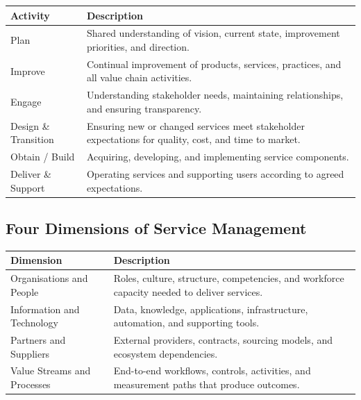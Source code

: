 \documentclass[
  letterpaper,
  DIV=11,
  numbers=noendperiod]{scrartcl}
\begin{document}
\begin{longtable}[]{@{}
  >{\raggedright\arraybackslash}p{}
  >{\raggedright\arraybackslash}p{}@{}}
\toprule\noalign{}
\begin{minipage}[b]{\linewidth}\raggedright
Activity
\end{minipage} & \begin{minipage}[b]{\linewidth}\raggedright
Description
\end{minipage} \\
\midrule\noalign{}
\endhead
\bottomrule\noalign{}
\endlastfoot
Plan & Shared understanding of vision, current state, improvement
priorities, and direction. \\
Improve & Continual improvement of products, services, practices, and
all value chain activities. \\
Engage & Understanding stakeholder needs, maintaining relationships, and
ensuring transparency. \\
Design \& Transition & Ensuring new or changed services meet stakeholder
expectations for quality, cost, and time to market. \\
Obtain / Build & Acquiring, developing, and implementing service
components. \\
Deliver \& Support & Operating services and supporting users according
to agreed expectations. \\
\end{longtable}

\subsection{Four Dimensions of Service
Management}\label{four-dimensions-of-service-management}

\begin{longtable}[]{@{}
  >{\raggedright\arraybackslash}p{}
  >{\raggedright\arraybackslash}p{}@{}}
\toprule\noalign{}
\begin{minipage}[b]{\linewidth}\raggedright
Dimension
\end{minipage} & \begin{minipage}[b]{\linewidth}\raggedright
Description
\end{minipage} \\
\midrule\noalign{}
\endhead
\bottomrule\noalign{}
\endlastfoot
Organisations and People & Roles, culture, structure, competencies, and
workforce capacity needed to deliver services. \\
Information and Technology & Data, knowledge, applications,
infrastructure, automation, and supporting tools. \\
Partners and Suppliers & External providers, contracts, sourcing models,
and ecosystem dependencies. \\
Value Streams and Processes & End-to-end workflows, controls,
activities, and measurement paths that produce outcomes. \\
\end{longtable}
\end{document}
